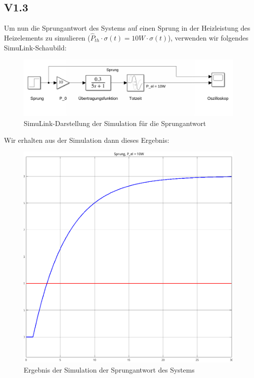 \documentclass{report}
\begin{document}
\newpage

\subsection{V1.3}

Um nun die Sprungantwort des Systems auf einen Sprung in der Heizleistung des Heizelements zu simulieren ($\hat{P}_{th} \cdot \sigma(t) = 10W \cdot \sigma(t)$), verwenden wir folgendes SimuLink-Schaubild:

\begin{figure}[h]
  \centering
  \includegraphics[width=\textwidth]{../assets/images/RTP/rtp_1_V13.png}
  \caption{SimuLink-Darstellung der Simulation für die Sprungantwort}
  \label{fig:rtp1v13}
\end{figure}

Wir erhalten aus der Simulation dann dieses Ergebnis:

\begin{figure}[h]
  \centering
  \includegraphics[width=\textwidth]{../assets/images/RTP/rtp_1_V13_2.png}
  \caption{Ergebnis der Simulation der Sprungantwort des Systems}
  \label{fig:rtp1v13_2}
\end{figure}
\end{document}
